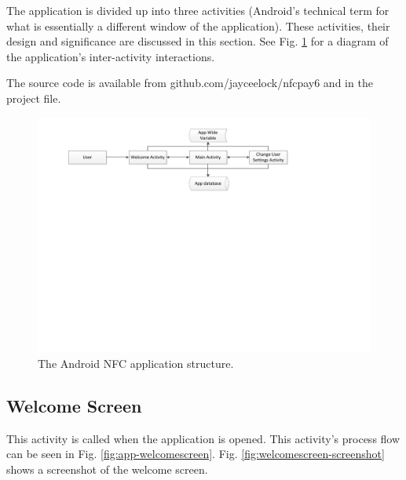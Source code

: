 The application is divided up into three activities (Android's technical term for what
is essentially a different window of the application). These activities, their design and
significance are discussed in this section. See Fig. \ref{fig:nfc_app_structure} for a
diagram of the application's inter-activity interactions.

The source code is available from github.com/jayceelock/nfcpay6 and in the
project file.

\begin{figure}
 \centering 
 \includegraphics[clip = true, trim = 40 410 0 20,
 scale=0.7]{app_structure}
 \caption{The Android NFC application structure.}
 \label{fig:nfc_app_structure}
\end{figure}

\subsection{Welcome Screen}

This activity is called when the application is opened. This
activity's process flow can be seen in Fig. \ref{fig:app-welcomescreen}.
Fig. \ref{fig:welcomescreen-screenshot} shows a screenshot of the welcome
screen.

